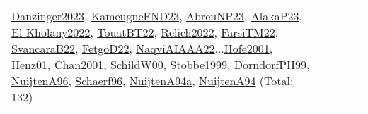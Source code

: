 {\begin{longtable}{p{3cm}r>{\raggedright\arraybackslash}p{6cm}>{\raggedright\arraybackslash}p{6cm}>{\raggedright\arraybackslash}p{8cm}}
\hyperref[detail:Danzinger2023]{Danzinger2023}, \hyperref[detail:KameugneFND23]{KameugneFND23}, \hyperref[detail:AbreuNP23]{AbreuNP23}, \hyperref[detail:AlakaP23]{AlakaP23}, \hyperref[detail:El-Kholany2022]{El-Kholany2022}, \hyperref[detail:TouatBT22]{TouatBT22}, \hyperref[detail:Relich2022]{Relich2022}, \hyperref[detail:FarsiTM22]{FarsiTM22}, \hyperref[detail:SvancaraB22]{SvancaraB22}, \hyperref[detail:FetgoD22]{FetgoD22}, \hyperref[detail:NaqviAIAAA22]{NaqviAIAAA22}...\hyperref[detail:Hofe2001]{Hofe2001}, \hyperref[detail:Henz01]{Henz01}, \hyperref[detail:Chan2001]{Chan2001}, \hyperref[detail:SchildW00]{SchildW00}, \hyperref[detail:Stobbe1999]{Stobbe1999}, \hyperref[detail:DorndorfPH99]{DorndorfPH99}, \hyperref[detail:NuijtenA96]{NuijtenA96}, \hyperref[detail:Schaerf96]{Schaerf96}, \hyperref[detail:NuijtenA94a]{NuijtenA94a}, \hyperref[detail:NuijtenA94]{NuijtenA94} (Total: 132)\\
\end{longtable}
}

